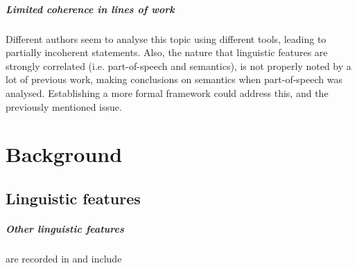\documentclass[a4paper,12pt,oneside,openright]{report}
\begin{document}
\paragraph{Limited coherence in lines of work} 
Different authors seem to analyse this topic using different tools, leading to partially incoherent statements.
Also, the nature that linguistic features are strongly correlated (i.e. part-of-speech and semantics), is not properly noted by a lot of previous work, making conclusions on semantics when part-of-speech was analysed.
Establishing a more formal framework could address this, and the previously mentioned issue.

\appendix
\singlespacing

%  

% 
% 
 

\chapter{Background}

\section{Linguistic features}\label{appendix:linguistic_features}

\paragraph{Other linguistic features} are recorded in \cite{wang19} and include
\end{document}
